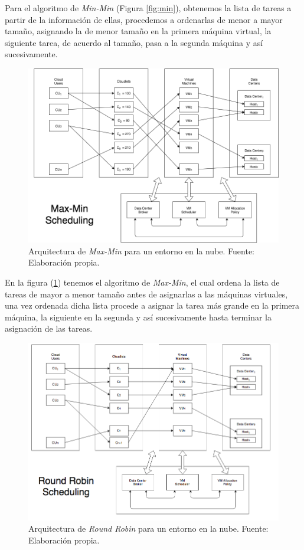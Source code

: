 Para el algoritmo de \textit{Min-Min} (Figura \ref{fig:min}), obtenemos la lista de tareas a partir de la informaci\'on de ellas, procedemos a ordenarlas de menor a mayor tama\~no, asignando la de menor tama\~no en la primera m\'aquina virtual, la siguiente tarea, de acuerdo al tama\~no, pasa a la segunda m\'aquina y as\'i sucesivamente.

\newpage
\renewcommand\thefigure{\arabic{figure}}
\begin{figure}[h!]
	\centering
	\includegraphics[scale=0.4]{media/imagencuatro}
	\caption{Arquitectura de \textit{Max-Min} para un entorno en la nube. Fuente: Elaboraci\'on propia.}
	\label{fig:max}
\end{figure}

En la figura (\ref{fig:max}) tenemos el algoritmo de \textit{Max-Min}, el cual ordena la lista de tareas de mayor a menor tama\~no antes de asignarlas a las m\'aquinas virtuales, una vez ordenada dicha lista procede a asignar la tarea m\'as grande en la primera m\'aquina, la siguiente en la segunda y as\'i sucesivamente hasta terminar la asignaci\'on de las tareas.

\newpage
\renewcommand\thefigure{\arabic{figure}}
\begin{figure}[h!]
	\centering
	\includegraphics[scale=0.4]{media/RRAlgorithm}
	\caption{Arquitectura de \textit{Round Robin} para un entorno en la nube. Fuente: Elaboración propia.}
	\label{fig:RRAlgorithm}
\end{figure}

